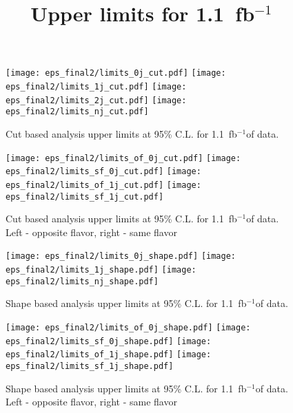 \documentclass{cmspaper}
\newcommand{\usedLumi}{1.1~fb$^{-1}$}
\begin{document}
\title{Upper limits for \usedLumi}

\begin{figure}[!htbp]
\begin{center}
   \texttt{[image: eps\_final2/limits\_0j\_cut.pdf]}
   \texttt{[image: eps\_final2/limits\_1j\_cut.pdf]}
   \texttt{[image: eps\_final2/limits\_2j\_cut.pdf]}
   \texttt{[image: eps\_final2/limits\_nj\_cut.pdf]}
   \caption{Cut based analysis upper limits at 95\% C.L. for \usedLumi of data.}
\end{center}
\end{figure}

\begin{figure}[!htbp]
\begin{center}
   \texttt{[image: eps\_final2/limits\_of\_0j\_cut.pdf]}
   \texttt{[image: eps\_final2/limits\_sf\_0j\_cut.pdf]}
   \texttt{[image: eps\_final2/limits\_of\_1j\_cut.pdf]}
   \texttt{[image: eps\_final2/limits\_sf\_1j\_cut.pdf]}
   \caption{Cut based analysis upper limits at 95\% C.L. for \usedLumi of data. 
     Left - opposite flavor, right - same flavor }
\end{center}
\end{figure}

\begin{figure}[!htbp]
\begin{center}
   \texttt{[image: eps\_final2/limits\_0j\_shape.pdf]}
   \texttt{[image: eps\_final2/limits\_1j\_shape.pdf]}
   \texttt{[image: eps\_final2/limits\_nj\_shape.pdf]}
   \caption{Shape based analysis upper limits at 95\% C.L. for \usedLumi of data.}
\end{center}
\end{figure}


\begin{figure}[!htbp]
\begin{center}
   \texttt{[image: eps\_final2/limits\_of\_0j\_shape.pdf]}
   \texttt{[image: eps\_final2/limits\_sf\_0j\_shape.pdf]}
   \texttt{[image: eps\_final2/limits\_of\_1j\_shape.pdf]}
   \texttt{[image: eps\_final2/limits\_sf\_1j\_shape.pdf]}
   \caption{Shape based analysis upper limits at 95\% C.L. for \usedLumi of data. 
     Left - opposite flavor, right - same flavor }
\end{center}
\end{figure}
\end{document}
